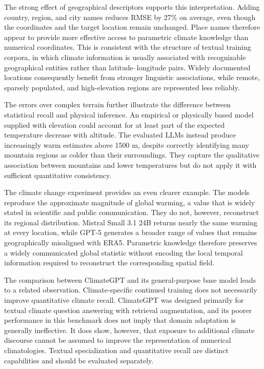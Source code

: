 The strong effect of geographical descriptors supports this interpretation. Adding country, region, and city names reduces RMSE by 27\% on average, even though the coordinates and the target location remain unchanged. Place names therefore appear to provide more effective access to parametric climate knowledge than numerical coordinates. This is consistent with the structure of textual training corpora, in which climate information is usually associated with recognizable geographical entities rather than latitude--longitude pairs. Widely documented locations consequently benefit from stronger linguistic associations, while remote, sparsely populated, and high-elevation regions are represented less reliably.

The errors over complex terrain further illustrate the difference between statistical recall and physical inference. An empirical or physically based model supplied with elevation could account for at least part of the expected temperature decrease with altitude. The evaluated LLMs instead produce increasingly warm estimates above 1500 m, despite correctly identifying many mountain regions as colder than their surroundings. They capture the qualitative association between mountains and lower temperatures but do not apply it with sufficient quantitative consistency.

The climate change experiment provides an even clearer example. The models reproduce the approximate magnitude of global warming, a value that is widely stated in scientific and public communication. They do not, however, reconstruct its regional distribution. Mistral Small 3.1 24B returns nearly the same warming at every location, while GPT-5 generates a broader range of values that remains geographically misaligned with ERA5. Parametric knowledge therefore preserves a widely communicated global statistic without encoding the local temporal information required to reconstruct the corresponding spatial field.

The comparison between ClimateGPT and its general-purpose base model leads to a related observation. Climate-specific continued training does not necessarily improve quantitative climate recall. ClimateGPT was designed primarily for textual climate question answering with retrieval augmentation, and its poorer performance in this benchmark does not imply that domain adaptation is generally ineffective. It does show, however, that exposure to additional climate discourse cannot be assumed to improve the representation of numerical climatologies. Textual specialization and quantitative recall are distinct capabilities and should be evaluated separately.

